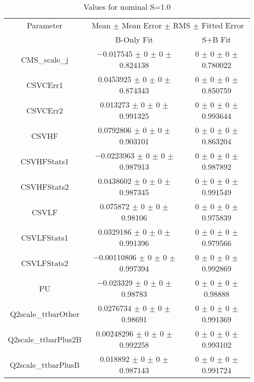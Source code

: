 \begin{table}
\centering
\caption{Values for nominal S=1.0}
\begin{tabular}{ccc}
\toprule
Parameter & \multicolumn{2}{c}{Mean $\pm$ Mean Error $\pm$ RMS $\pm$ Fitted Error}\\
 & B-Only Fit & S+B Fit\\
\midrule
CMS\_scale\_j & \num{-0.017545} $\pm$ \num{0} $\pm$ \num{0} $\pm$ \num{0.824138} & \num{0} $\pm$ \num{0} $\pm$ \num{0} $\pm$ \num{0.780022}\\
CSVCErr1 & \num{0.0453925} $\pm$ \num{0} $\pm$ \num{0} $\pm$ \num{0.874343} & \num{0} $\pm$ \num{0} $\pm$ \num{0} $\pm$ \num{0.850759}\\
CSVCErr2 & \num{0.013273} $\pm$ \num{0} $\pm$ \num{0} $\pm$ \num{0.991325} & \num{0} $\pm$ \num{0} $\pm$ \num{0} $\pm$ \num{0.993644}\\
CSVHF & \num{0.0792806} $\pm$ \num{0} $\pm$ \num{0} $\pm$ \num{0.903101} & \num{0} $\pm$ \num{0} $\pm$ \num{0} $\pm$ \num{0.863204}\\
CSVHFStats1 & \num{-0.0223963} $\pm$ \num{0} $\pm$ \num{0} $\pm$ \num{0.987913} & \num{0} $\pm$ \num{0} $\pm$ \num{0} $\pm$ \num{0.987892}\\
CSVHFStats2 & \num{0.0438602} $\pm$ \num{0} $\pm$ \num{0} $\pm$ \num{0.987345} & \num{0} $\pm$ \num{0} $\pm$ \num{0} $\pm$ \num{0.991549}\\
CSVLF & \num{0.075872} $\pm$ \num{0} $\pm$ \num{0} $\pm$ \num{0.98106} & \num{0} $\pm$ \num{0} $\pm$ \num{0} $\pm$ \num{0.975839}\\
CSVLFStats1 & \num{0.0329186} $\pm$ \num{0} $\pm$ \num{0} $\pm$ \num{0.991396} & \num{0} $\pm$ \num{0} $\pm$ \num{0} $\pm$ \num{0.979566}\\
CSVLFStats2 & \num{-0.00110806} $\pm$ \num{0} $\pm$ \num{0} $\pm$ \num{0.997394} & \num{0} $\pm$ \num{0} $\pm$ \num{0} $\pm$ \num{0.992869}\\
PU & \num{-0.023329} $\pm$ \num{0} $\pm$ \num{0} $\pm$ \num{0.98783} & \num{0} $\pm$ \num{0} $\pm$ \num{0} $\pm$ \num{0.98888}\\
Q2scale\_ttbarOther & \num{0.0276734} $\pm$ \num{0} $\pm$ \num{0} $\pm$ \num{0.98691} & \num{0} $\pm$ \num{0} $\pm$ \num{0} $\pm$ \num{0.991369}\\
Q2scale\_ttbarPlus2B & \num{0.00248296} $\pm$ \num{0} $\pm$ \num{0} $\pm$ \num{0.992258} & \num{0} $\pm$ \num{0} $\pm$ \num{0} $\pm$ \num{0.993102}\\
Q2scale\_ttbarPlusB & \num{0.018892} $\pm$ \num{0} $\pm$ \num{0} $\pm$ \num{0.987143} & \num{0} $\pm$ \num{0} $\pm$ \num{0} $\pm$ \num{0.991724}\\

\end{tabular}
\end{table}
